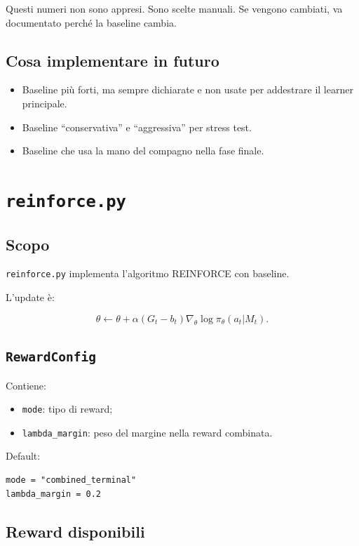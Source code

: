 \documentclass[11pt,a4paper]{article}
\begin{document}
Questi numeri non sono appresi. Sono scelte manuali. Se vengono cambiati, va
documentato perché la baseline cambia.

\subsection{Cosa implementare in futuro}

\begin{itemize}
  \item Baseline più forti, ma sempre dichiarate e non usate per addestrare il
  learner principale.
  \item Baseline ``conservativa'' e ``aggressiva'' per stress test.
  \item Baseline che usa la mano del compagno nella fase finale.
\end{itemize}

\section{\texttt{reinforce.py}}

\subsection{Scopo}

\texttt{reinforce.py} implementa l'algoritmo REINFORCE con baseline.

L'update è:

\[
\theta
\leftarrow
\theta
+
\alpha
(G_t-b_t)
\nabla_\theta \log \pi_\theta(a_t|M_t).
\]

\subsection{\texttt{RewardConfig}}

Contiene:

\begin{itemize}
  \item \texttt{mode}: tipo di reward;
  \item \texttt{lambda\_margin}: peso del margine nella reward combinata.
\end{itemize}

Default:

\begin{verbatim}
mode = "combined_terminal"
lambda_margin = 0.2
\end{verbatim}

\subsection{Reward disponibili}
\end{document}
